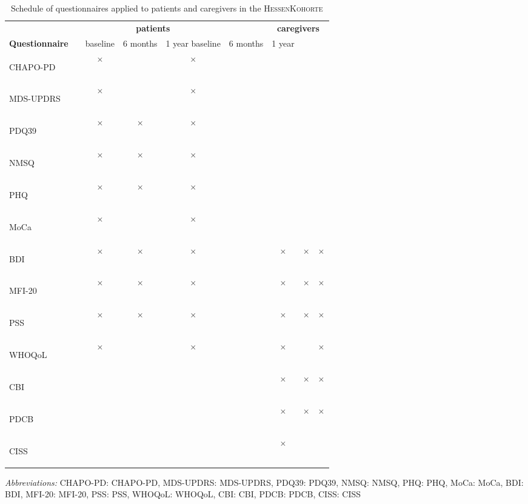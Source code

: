 \newcommand{\FC}{$\times$}
\newcommand{\emC}{}
\newcommand{\acb}[1]{\acs{#1}: \acl{#1}}
\newcommand{\acv}[1]{\begin{NoHyper}\acs{#1}\end{NoHyper}}
\begin{table}[H]
\begin{tabular}{lcccccccc}
\caption{Schedule of questionnaires applied to patients and caregivers in the \textsc{HessenKohorte}}
\label{tab:questionnaireSchedule}\\
\textbf{} & & \multicolumn{3}{c}{\textbf{patients}} & & \multicolumn{3}{c}{\textbf{caregivers}} \\[1em]
\textbf{Questionnaire}& & baseline & 6 months & 1 year  baseline   & 6 months & 1 year \\[1em]
\acv{CHAPO-PD}        & & \FC{}    & \emC{}   & \FC{}   & & \emC{} & \emC{}   & \emC{} \\
\acv{MDS-UPDRS}       & & \FC{}    & \emC{}   & \FC{}   & & \emC{} & \emC{}   & \emC{} \\
\acv{PDQ39}           & & \FC{}    & \FC{}    & \FC{}   & & \emC{} & \emC{}   & \emC{} \\
\acv{NMSQ}            & & \FC{}    & \FC{}    & \FC{}   & & \emC{} & \emC{}   & \emC{} \\
\acv{PHQ}             & & \FC{}    & \FC{}    & \FC{}   & & \emC{} & \emC{}   & \emC{} \\
\acv{MoCa}            & & \FC{}    & \emC{}   & \FC{}   & & \emC{} & \emC{}   & \emC{} \\
\acv{BDI}             & & \FC{}    & \FC{}    & \FC{}   & & \FC{}  & \FC{}    & \FC{}  \\
\acv{MFI-20}          & & \FC{}    & \FC{}    & \FC{}   & & \FC{}  & \FC{}    & \FC{}  \\
\acv{PSS}             & & \FC{}    & \FC{}    & \FC{}   & & \FC{}  & \FC{}    & \FC{}  \\ 
\acv{WHOQoL}          & & \FC{}    & \emC{}   & \FC{}   & & \FC{}  & \emC{}   & \FC{}  \\
\acv{CBI}             & & \emC{}   & \emC{}   & \emC{}  & & \FC{}  & \FC{}    & \FC{}  \\
\acv{PDCB}            & & \emC{}   & \emC{}   & \emC{}  & & \FC{}  & \FC{}    & \FC{}  \\                              
\acv{CISS}            & & \emC{}   & \emC{}   & \emC{}  & & \FC{}  & \emC{}   & \emC{}
\end{tabular}

\bigskip
\footnotesize{\textit{Abbreviations:} \acb{CHAPO-PD}, \acb{MDS-UPDRS}, \acb{PDQ39}, \acb{NMSQ}, \acb{PHQ},
\acb{MoCa}, \acb{BDI}, \acb{MFI-20}, \acb{PSS}, \acb{WHOQoL}, \acb{CBI}, \acb{PDCB}, \acb{CISS}}
\end{table}
